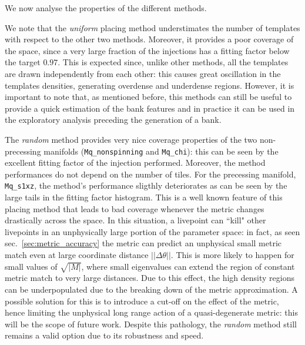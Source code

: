 \documentclass[twocolumn,showpacs,preprintnumbers,nofootinbib,prd,
superscriptaddress,10pt]{revtex4-2}
\begin{document}
We now analyse the properties of the different methods.

We note that the {\it uniform} placing method understimates the number of templates with respect to the other two methods. Moreover, it provides a poor coverage of the space, since a very large fraction of the injections has a fitting factor below the target $0.97$. This is expected since, unlike other methods, all the templates are drawn independently from each other: this causes great oscillation in the templates densities, generating overdense and underdense regions.
However, it is important to note that, as mentioned before, this methods can still be useful to provide a quick estimation of the bank features and in practice it can be used in the exploratory analysis preceding the generation of a bank.

The {\it random} method provides very nice coverage properties of the two non-precessing manifolds (\texttt{Mq\_nonspinning} and \texttt{Mq\_chi}): this can be seen by the excellent fitting factor of the injection performed. Moreover, the method performances do not depend on the number of tiles.
For the precessing manifold, \texttt{Mq\_s1xz}, the method's performance sligthly deteriorates as can be seen by the large tails in the fitting factor histogram.
This is a well known feature of this placing method that leads to bad coverage whenever the metric changes drastically across the space. In this situation, a livepoint can ``kill" other livepoints in an unphysically large portion of the parameter space: in fact, as seen sec.~\ref{sec:metric_accuracy} the metric can predict an unphysical small metric match even at large coordinate distance $||\Delta\theta||$. This is more likely to happen for small values of $\sqrt{|M|}$, where small eigenvalues can extend the region of constant metric match to very large distances.
Due to this effect, the high density regions can be underpopulated due to the breaking down of the metric approximation. A possible solution for this is to introduce a cut-off on the effect of the metric, hence limiting the unphysical long range action of a quasi-degenerate metric: this will be the scope of future work.
Despite this pathology, the {\it random} method still remains a valid option due to its robustness and speed.
\end{document}
